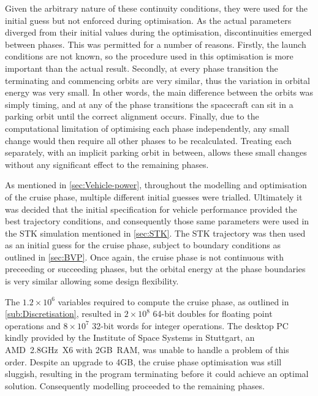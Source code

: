 Given the arbitrary nature of these continuity conditions, they were used for the initial guess but not enforced during optimisation. As the actual parameters diverged from their initial values during the optimisation, discontinuities emerged between phases. This was permitted for a number of reasons. Firstly, the launch conditions are not known, so the procedure used in this optimisation is more important than the actual result. Secondly, at every phase transition the terminating and commencing orbits are very similar, thus the variation in orbital energy was very small. In other words, the main difference between the orbits was simply timing, and at any of the phase transitions the spacecraft can sit in a parking orbit until the correct alignment occurs. Finally, due to the computational limitation of optimising each phase independently, any small change would then require all other phases to be recalculated. Treating each separately, with an implicit parking orbit in between, allows these small changes without any significant effect to the remaining phases.

As mentioned in \autoref{sec:Vehicle-power}, throughout the modelling and optimisation of the cruise phase, multiple different initial guesses were trialled. Ultimately it was decided that the initial specification for vehicle performance provided the best trajectory conditions, and consequently those same parameters were used in the STK simulation mentioned in \autoref{sec:STK}. The STK trajectory was then used as an initial guess for the cruise phase, subject to boundary conditions as outlined in \autoref{sec:BVP}. Once again, the cruise phase is not continuous with preceeding or succeeding phases, but the orbital energy at the phase boundaries is very similar allowing some design flexibility.

The $1.2\times10^6$ variables required to compute the cruise phase, as outlined in \autoref{sub:Discretisation}, resulted in $2\times10^8$ 64-bit doubles for floating point operations and $8\times10^7$ 32-bit words for integer operations. The desktop PC kindly provided by the Institute of Space Systems in Stuttgart, an AMD~2.8GHz~X6 with 2GB~RAM, was unable to handle a problem of this order. Despite an upgrade to 4GB, the cruise phase optimisation was still sluggish, resulting in the program terminating before it could achieve an optimal solution. Consequently modelling proceeded to the remaining phases.

